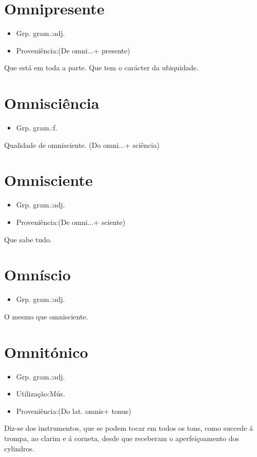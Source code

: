 \section{Omnipresente}
\begin{itemize}
\item {Grp. gram.:adj.}
\end{itemize}
\begin{itemize}
\item {Proveniência:(De \textunderscore omni...\textunderscore  + \textunderscore presente\textunderscore )}
\end{itemize}
Que está em toda a parte.
Que tem o carácter da ubiquidade.
\section{Omnisciência}
\begin{itemize}
\item {Grp. gram.:f.}
\end{itemize}
Qualidade de omnisciente.
(Do \textunderscore omni...\textunderscore  + \textunderscore sciência\textunderscore )
\section{Omnisciente}
\begin{itemize}
\item {Grp. gram.:adj.}
\end{itemize}
\begin{itemize}
\item {Proveniência:(De \textunderscore omni...\textunderscore  + \textunderscore sciente\textunderscore )}
\end{itemize}
Que sabe tudo.
\section{Omníscio}
\begin{itemize}
\item {Grp. gram.:adj.}
\end{itemize}
O mesmo que \textunderscore omnisciente\textunderscore .
\section{Omnitónico}
\begin{itemize}
\item {Grp. gram.:adj.}
\end{itemize}
\begin{itemize}
\item {Utilização:Mús.}
\end{itemize}
\begin{itemize}
\item {Proveniência:(Do lat. \textunderscore omnis\textunderscore  + \textunderscore tonus\textunderscore )}
\end{itemize}
Diz-se dos instrumentos, que se podem tocar em todos os tons, como succede á trompa, ao clarim e á corneta, desde que receberam o aperfeiçoamento dos cylindros.

